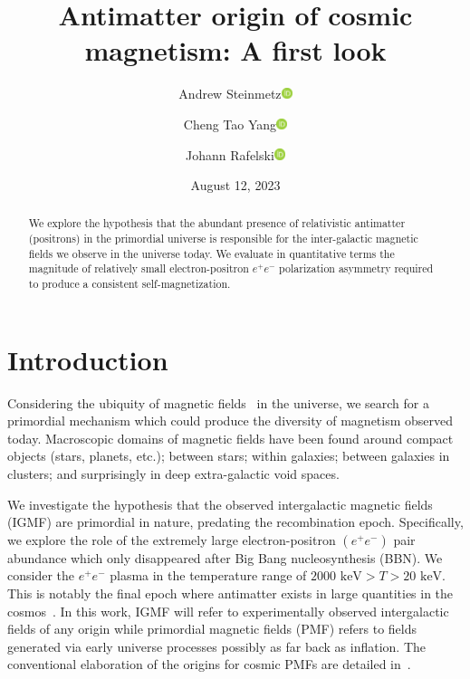 \documentclass[reprint]{revtex4-2}
\newcommand{\orcidicon}{\includegraphics[width=0.32cm]{orcid.pdf}}
\newcommand{\orc}[1]{\href{https://orcid.org/#1}{\orcidicon}}
\newcommand{\orcA}{0000-0001-8217-1484}
\newcommand{\orcB}{0000-0001-5038-8427}
\newcommand{\orcC}{0000-0001-5474-2649}
\newcommand*{\keV}{\text{ keV}}
\begin{document}
\title{Antimatter origin of cosmic magnetism: A first look}
\author{Andrew Steinmetz\orc{\orcC}}
\author{Cheng Tao Yang\orc{\orcB}}
\author{Johann Rafelski\orc{\orcA}}

\date{August 12, 2023}

\begin{abstract}
    We explore the hypothesis that the abundant presence of relativistic antimatter (positrons) in the primordial universe is responsible for the inter-galactic magnetic fields we observe in the universe today. We evaluate in quantitative terms the magnitude of  relatively small electron-positron $e^{+}e^{-}$ polarization asymmetry  required to produce a consistent self-magnetization.
\end{abstract}


\maketitle

\section{Introduction}
\label{sec:introduction}
\noindent  
Considering the ubiquity of magnetic fields~\cite{giovannini2018probing,giovannini2003magnetized,kronberg1994extragalactic} in the universe, we search for a primordial mechanism which could produce the diversity of magnetism observed today. Macroscopic domains of magnetic fields have been found around compact objects (stars, planets, etc.); between stars; within galaxies; between galaxies in clusters; and surprisingly in deep extra-galactic void spaces.

We investigate the hypothesis that the observed intergalactic magnetic fields (IGMF) are primordial in nature, predating the recombination epoch. Specifically, we explore the role of the extremely large electron-positron $(e^{+}e^{-})$ pair abundance which only disappeared after Big Bang nucleosynthesis (BBN). We consider the $e^{+}e^{-}$ plasma in the temperature range of $2000\keV>T>20\keV$. This is notably the final epoch where antimatter exists in large quantities in the cosmos~\cite{rafelski2023short}. In this work, IGMF will refer to experimentally observed intergalactic fields of any origin while primordial magnetic fields (PMF) refers to fields generated via early universe processes possibly as far back as inflation. The conventional elaboration of the origins for cosmic PMFs are detailed in~\cite{gaensler2004origin,durrer2013cosmological,batista2021gammaray}.
\end{document}
